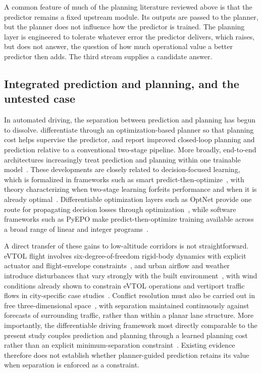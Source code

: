 \documentclass[11pt]{article}
\theoremstyle{plain}
\theoremstyle{definition}
\begin{document}
A common feature of much of the planning literature reviewed above is
that the predictor remains a fixed upstream module. Its outputs are
passed to the planner, but the planner does not influence how the
predictor is trained. The planning layer is engineered to tolerate
whatever error the predictor delivers, which raises, but does not
answer, the question of how much operational value a better predictor
then adds. The third stream supplies a candidate answer.

\subsection{Integrated prediction and planning, and the untested case}
\label{sec:related-integrated}

In automated driving, the separation between prediction and planning
has begun to dissolve. \citet{huang2023differentiable} differentiate
through an optimization-based planner so that planning cost helps
supervise the predictor, and report improved closed-loop planning and
prediction relative to a conventional two-stage pipeline. More
broadly, end-to-end architectures increasingly treat prediction and
planning within one trainable model~\citep{zhang2025bridging}. These
developments are closely related to decision-focused learning, which
is formalized in frameworks such as smart
predict-then-optimize~\citep{elmachtoub2022smart}, with theory
characterizing when two-stage learning forfeits performance and when
it is already
optimal~\citep{cameron2022perils,mandi2024decisionfocused}.
Differentiable optimization layers such as OptNet provide one route
for propagating decision losses through
optimization~\citep{amos2017optnet}, while software frameworks such
as PyEPO make predict-then-optimize training available across a
broad range of linear and integer programs~\citep{tang2022pyepo}.

A direct transfer of these gains to low-altitude corridors is not
straightforward. eVTOL flight involves six-degree-of-freedom
rigid-body dynamics with explicit actuator and flight-envelope
constraints~\citep{acheson2024guam,campbell2024pyguam}, and urban
airflow and weather introduce disturbances that vary strongly with
the built environment~\citep{nithya2024wind,reiche2021initial}, with
wind conditions already shown to constrain eVTOL operations and
vertiport traffic flows in city-specific case
studies~\citep{schweiger2023wind}.
Conflict resolution must also be carried out in free
three-dimensional space~\citep{rezaee2024collision}, with separation
maintained continuously against forecasts of surrounding traffic,
rather than within a planar lane structure. More importantly, the
differentiable driving framework most directly comparable to the
present study couples prediction and planning through a learned
planning cost rather than an explicit minimum-separation
constraint~\citep{huang2023differentiable}. Existing evidence
therefore does not establish whether planner-guided prediction
retains its value when separation is enforced as a constraint.
\end{document}
